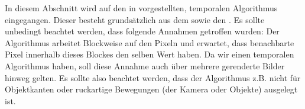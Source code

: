 In diesem Abschnitt wird auf den in \cite{hal-02158423} vorgestellten, temporalen Algorithmus eingegangen.
Dieser besteht grundsätzlich aus dem  sowie den 
. Es sollte unbedingt beachtet werden, dass folgende
Annahmen getroffen wurden: Der Algorithmus arbeitet Blockweise auf den Pixeln und erwartet, dass benachbarte
Pixel innerhalb dieses Blockes den selben Wert haben. Da wir einen temporalen Algorithmus haben, soll diese Annahme 
auch über mehrere gerenderte Bilder hinweg gelten. Es sollte also beachtet werden, dass der Algorithmus z.B. nicht 
für Objektkanten oder ruckartige Bewegungen (der Kamera oder Objekte) ausgelegt ist.
\cite{heitz:hal-02150657}